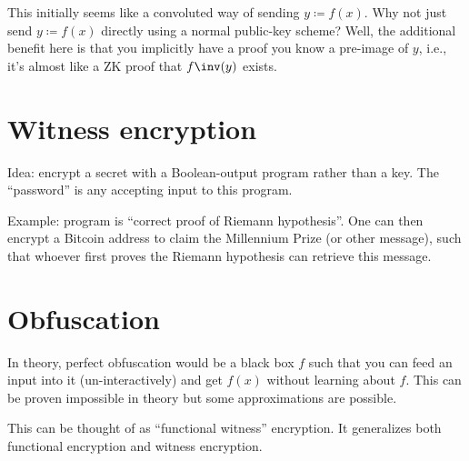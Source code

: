 \documentclass[11pt]{scrreprt}
\begin{document}
This initially seems like a convoluted way of sending $y \coloneqq f(x)$.
Why not just send $y \coloneqq f(x)$ directly using a normal public-key scheme?
Well, the additional benefit here is that you implicitly have a proof you know
a pre-image of $y$, i.e., it's almost like a ZK proof that $f\inv(y)$ exists.

\section{Witness encryption}
Idea: encrypt a secret with a Boolean-output program rather than a key.
The ``password'' is any accepting input to this program.

Example: program is ``correct proof of Riemann hypothesis''.
One can then encrypt a Bitcoin address to claim the Millennium Prize (or other message),
such that whoever first proves the Riemann hypothesis can retrieve this message.

\section{Obfuscation}
In theory, perfect obfuscation would be a black box $f$ such that you can feed
an input into it (un-interactively) and get $f(x)$ without learning about $f$.
This can be proven impossible in theory but some approximations are possible.

This can be thought of as ``functional witness'' encryption.
It generalizes both functional encryption and witness encryption.
\end{document}
